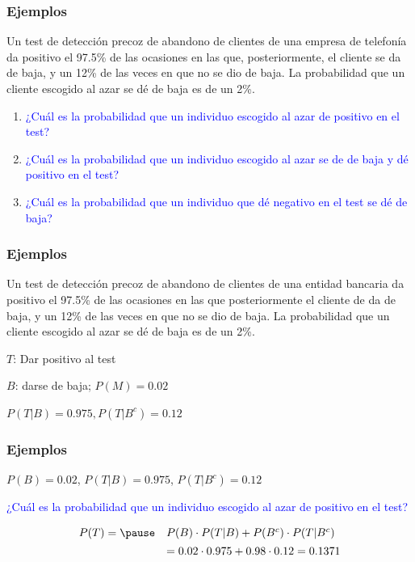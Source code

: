 \documentclass[handout]{beamer}\usepackage[]{graphicx}\usepackage[]{color}
\newcommand{\blue}[1]{\textcolor{blue}{#1}}
\theoremstyle{plain}
\theoremstyle{definition}
\begin{document}
\begin{frame}
\frametitle{Ejemplos}  

Un test de detección precoz de abandono de clientes de una  empresa de telefonía  da  positivo el 97.5\% de las ocasiones en las que, posteriormente, el cliente se da de baja, y un 12\% de las veces en que no se dio de baja. La probabilidad que un cliente escogido al azar se dé de baja es de un 2\%.

\begin{enumerate}
\item \blue{¿Cuál  es la probabilidad que un individuo escogido al azar de positivo  en el test?}
\item \blue{¿Cuál  es la probabilidad que un individuo escogido al azar se de de  baja y dé positivo en el test?}
\item \blue{¿Cuál  es la probabilidad que un individuo  que dé negativo en el test se dé de baja?}
\end{enumerate}

\end{frame}


\begin{frame}
\frametitle{Ejemplos}  

Un test de detección precoz de abandono de clientes de una entidad bancaria  da  positivo el 97.5\% de las ocasiones en las que posteriormente el cliente de da de baja, y un 12\% de las veces en que no se dio de baja. La probabilidad que un cliente escogido al azar se dé de baja es de un 2\%.
\medskip

$T$: Dar positivo al test\medskip

$B$: darse de baja; $P(M)=0.02$
\medskip

$P(T|B)=0.975, P(T|B^c)=0.12$


\end{frame}


\begin{frame}
\frametitle{Ejemplos}  

$P(B)=0.02$, $P(T|B)=0.975$, $P(T|B^c)=0.12$
\medskip

 \blue{¿Cuál  es la probabilidad que un individuo escogido al azar de positivo  en el test?}

$$
\begin{array}{rl}
P(T) =\pause & P(B)\cdot P(T|B)+P(B^c)\cdot P(T|B^c)\\[1ex]
& =0.02\cdot 0.975+0.98\cdot 0.12=0.1371
\end{array}
$$


\end{frame}
\end{document}
